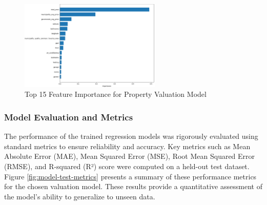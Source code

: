 \begin{figure}[htbp]
    \centering
    \includegraphics[width=0.6\textwidth]{images/top_15_feature_importance.png} %
    \caption{Top 15 Feature Importance for Property Valuation Model}
    \label{fig:feature-importance}
\end{figure}

\subsubsection{Model Evaluation and Metrics}
The performance of the trained regression models was rigorously evaluated using standard metrics to ensure reliability and accuracy. Key metrics such as Mean Absolute Error (MAE), Mean Squared Error (MSE), Root Mean Squared Error (RMSE), and R-squared (R²) score were computed on a held-out test dataset. Figure \ref{fig:model-test-metrics} presents a summary of these performance metrics for the chosen valuation model. These results provide a quantitative assessment of the model's ability to generalize to unseen data.


